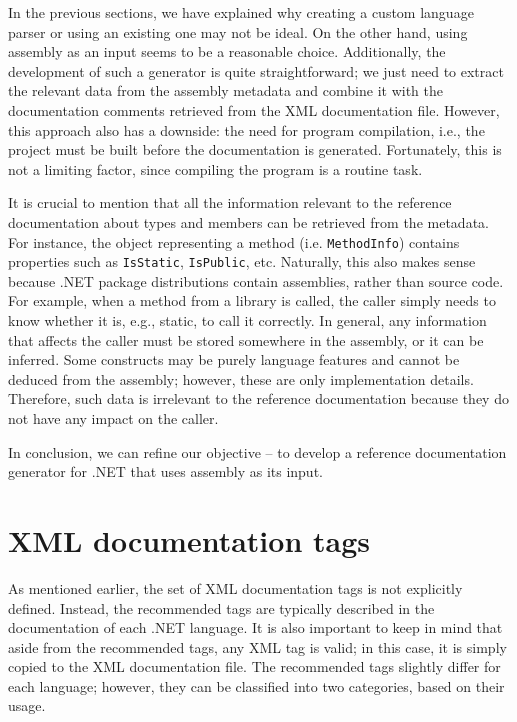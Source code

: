 In the previous sections, we have explained why creating a custom language parser or using an existing one may not be ideal.
On the other hand, using assembly as an input seems to be a reasonable choice.
Additionally, the development of such a generator is quite straightforward; we just need to extract the relevant data from the assembly metadata and combine it with the documentation comments retrieved from the XML documentation file.
However, this approach also has a downside: the need for program compilation, i.e., the project must be built before the documentation is generated.
Fortunately, this is not a limiting factor, since compiling the program is a routine task.

It is crucial to mention that all the information relevant to the reference documentation about types and members can be retrieved from the metadata. 
For instance, the object representing a method (i.e. \texttt{MethodInfo}) contains properties such as \texttt{IsStatic}, \texttt{IsPublic}, etc.
Naturally, this also makes sense because .NET package distributions contain assemblies, rather than source code.
For example, when a method from a library is called, the caller simply needs to know whether it is, e.g., static, to call it correctly.
In general, any information that affects the caller must be stored somewhere in the assembly, or it can be inferred.
Some constructs may be purely language features and cannot be deduced from the assembly; however, these are only implementation details.
Therefore, such data is irrelevant to the reference documentation because they do not have any impact on the caller.

In conclusion, we can refine our objective -- to develop a reference
documentation generator for .NET that uses assembly as its input.

\section{XML documentation tags}

As mentioned earlier, the set of XML documentation tags is not explicitly defined. 
Instead, the recommended tags are typically described in the documentation of each .NET language.
It is also important to keep in mind that aside from the recommended tags, any XML tag is valid; in this case, it is simply copied to the XML documentation file.
The recommended tags slightly differ for each language; however, they can be classified into two categories, based on their usage.

